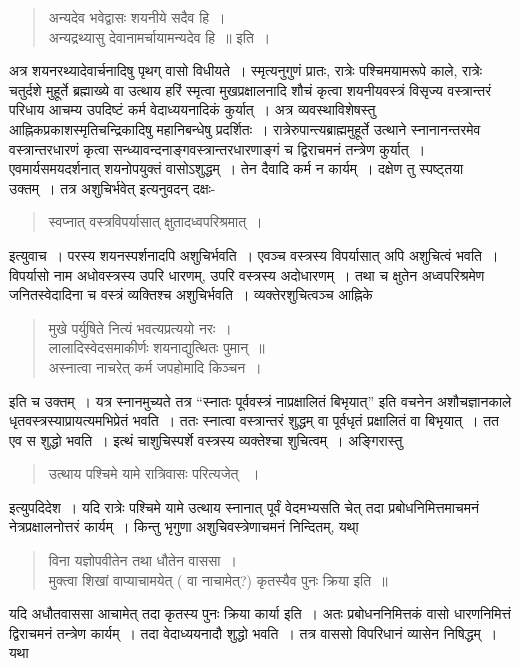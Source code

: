 {\begin{verse}
अन्यदेव भवेद्वासः शयनीये सदैव हि~। \\
अन्यद्रथ्यासु देवानामर्चायामन्यदेव हि~॥ इति~। 
\end{verse}
अत्र शयनरथ्यादेवार्चनादिषु  पृथग् वासो विधीयते~। स्मृत्यनुगुणं प्रातः, रात्रेः पश्चिमयामरूपे काले, रात्रेः चतुर्दशे मुहूर्ते ब्रह्माख्ये वा उत्थाय हरिं स्मृत्वा मुखप्रक्षालनादि शौचं कृत्वा शयनीयवस्त्रं विसृज्य वस्त्रान्तरं परिधाय आचम्य उपदिष्टं कर्म वेदाध्ययनादिकं कुर्यात्~। अत्र व्यवस्थाविशेषस्तु आह्निकप्रकाशस्मृतिचन्द्रिकादिषु महानिबन्धेषु प्रदर्शितः~। रात्रेरुपान्त्यब्राह्ममुहूर्ते उत्थाने स्नानानन्तरमेव वस्त्रान्तरधारणं कृत्वा सन्ध्यावन्दनाङ्गवस्त्रान्तरधारणाङ्गं च द्विराचमनं तन्त्रेण कुर्यात्~। एवमार्यसमयदर्शनात् शयनोपयुक्तं वासोऽशुद्धम्~। तेन दैवादि कर्म न कार्यम्~। दक्षेण तु स्पष्ट्तया उक्तम्~। तत्र अशुचिर्भवेत् इत्यनुवदन् दक्षः- 
\begin{verse}
स्वप्नात् वस्त्रविपर्यासात् क्षुतादध्वपरिश्रमात्~। 
\end{verse}
इत्युवाच~। परस्य शयनस्पर्शनादपि अशुचिर्भवति~। एवञ्च वस्त्रस्य विपर्यासात् अपि अशुचित्वं भवति~। विपर्यासो नाम अधोवस्त्रस्य उपरि धारणम्, उपरि वस्त्रस्य अदोधारणम्~। तथा च क्षुतेन अध्वपरिश्रमेण जनितस्वेदादिना च वस्त्रं व्यक्तिश्च अशुचिर्भवति~। व्यक्तेरशुचित्वञ्च आह्निके 
\begin{verse}
मुखे पर्युषिते नित्यं भवत्यप्रत्ययो नरः~। \\
लालादिस्वेदसमाकीर्णः शयनाद्युत्थितः पुमान्~॥\\
अस्नात्वा नाचरेत् कर्म जपहोमादि किञ्चन~। 
\end{verse}
इति च उक्तम्~। यत्र स्नानमुच्यते तत्र “स्नातः पूर्ववस्त्रं नाप्रक्षालितं बिभृयात्” इति वचनेन अशौचज्ञानकाले धृतवस्त्रस्याप्रायत्यमभिप्रेतं भवति~। ततः स्नात्वा वस्त्रान्तरं शुद्धम् वा पूर्वधृतं प्रक्षालितं वा बिभृयात्~। तत एव स शुद्धो भवति~। इत्थं चाशुचिस्पर्शे वस्त्रस्य व्यक्तेश्चा शुचित्वम्~। अङ्गिरास्तु 
\begin{verse}
उत्थाय पश्चिमे यामे रात्रिवासः परित्यजेत् ~। 
\end{verse}
इत्युपदिदेश~। यदि रात्रेः पश्चिमे यामे उत्थाय स्नानात् पूर्वं वेदमभ्यसति चेत् तदा प्रबोधनिमित्तमाचमनं नेत्रप्रक्षालनोत्तरं कार्यम्~। किन्तु भृगुणा अशुचिवस्त्रेणाचमनं निन्दितम्, यथा् \
\begin{verse}
विना यज्ञोपवीतेन तथा धौतेन वाससा~। \\
मुक्त्वा शिखां वाप्याचामयेत् ( वा नाचामेत्?) कृतस्यैव पुनः क्रिया इति~॥ 
\end{verse}
यदि अधौतवाससा आचामेत् तदा कृतस्य पुनः क्रिया कार्या इति~। अतः प्रबोधननिमित्तकं वासो धारणनिमित्तं द्विराचमनं तन्त्रेण कार्यम्~। तदा वेदाध्ययनादौ शुद्धो भवति~। तत्र वाससो विपरिधानं व्यासेन निषिद्धम्~। यथा \
}
